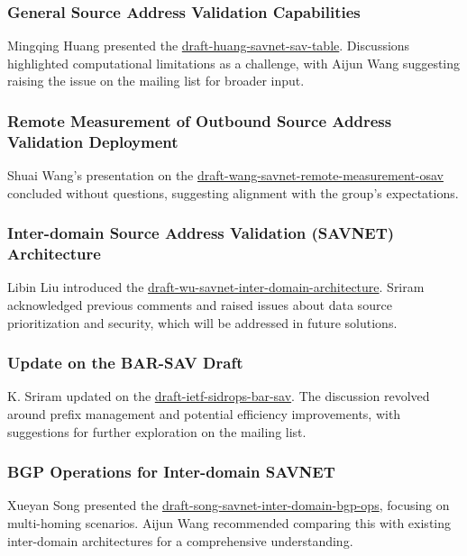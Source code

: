 \documentclass{article}
\begin{document}
\subsubsection{General Source Address Validation Capabilities}
Mingqing Huang presented the \href{https://datatracker.ietf.org/doc/draft-huang-savnet-sav-table/07/}{draft-huang-savnet-sav-table}. Discussions highlighted computational limitations as a challenge, with Aijun Wang suggesting raising the issue on the mailing list for broader input.

\subsubsection{Remote Measurement of Outbound Source Address Validation Deployment}
Shuai Wang's presentation on the \href{https://datatracker.ietf.org/doc/draft-wang-savnet-remote-measurement-osav/}{draft-wang-savnet-remote-measurement-osav} concluded without questions, suggesting alignment with the group's expectations.

\subsubsection{Inter-domain Source Address Validation (SAVNET) Architecture}
Libin Liu introduced the \href{https://datatracker.ietf.org/doc/draft-wu-savnet-inter-domain-architecture/}{draft-wu-savnet-inter-domain-architecture}. Sriram acknowledged previous comments and raised issues about data source prioritization and security, which will be addressed in future solutions.

\subsubsection{Update on the BAR-SAV Draft}
K. Sriram updated on the \href{https://datatracker.ietf.org/doc/draft-ietf-sidrops-bar-sav/}{draft-ietf-sidrops-bar-sav}. The discussion revolved around prefix management and potential efficiency improvements, with suggestions for further exploration on the mailing list.

\subsubsection{BGP Operations for Inter-domain SAVNET}
Xueyan Song presented the \href{https://datatracker.ietf.org/doc/draft-song-savnet-inter-domain-bgp-ops/}{draft-song-savnet-inter-domain-bgp-ops}, focusing on multi-homing scenarios. Aijun Wang recommended comparing this with existing inter-domain architectures for a comprehensive understanding.
\end{document}
